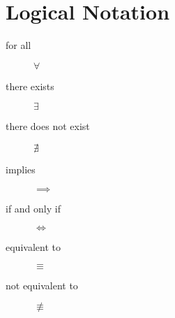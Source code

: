 \section{Logical Notation}
\begin{description}
    \item[for all] $\forall$
    \item[there exists] $\exists$
    \item[there does not exist] $\nexists$
    \item[implies] $\implies$
    \item[if and only if] $\iff$
    \item[equivalent to] $\equiv$
    \item[not equivalent to] $\not\equiv$
\end{description}

